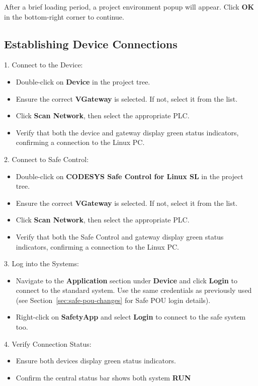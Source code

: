 \documentclass[a4paper,12pt]{article}
\begin{document}
After a brief loading period, a project environment popup will appear. Click \textbf{OK} in the bottom-right corner to continue.

\subsection{Establishing Device Connections}

1. Connect to the Device:
\begin{itemize}
	\item Double-click on \textbf{Device} in the project tree.
	\item Ensure the correct \textbf{VGateway} is selected. If not, select it from the list.
	\item Click \textbf{Scan Network}, then select the appropriate PLC.
	\item Verify that both the device and gateway display green status indicators, confirming a connection to the Linux PC.
\end{itemize}

2. Connect to Safe Control:
\begin{itemize}
	\item Double-click on \textbf{CODESYS Safe Control for Linux SL} in the project tree.
	\item Ensure the correct \textbf{VGateway} is selected. If not, select it from the list.
	\item Click \textbf{Scan Network}, then select the appropriate PLC.
	\item Verify that both the Safe Control and gateway display green status indicators, confirming a connection to the Linux PC.
\end{itemize}

3. Log into the Systems:
\begin{itemize}
	\item Navigate to the \textbf{Application} section under \textbf{Device} and click \textbf{Login} to connect to the standard system. Use the same credentials as previously used (see Section~\ref{sec:safe-pou-changes} for Safe POU login details).
	\item Right-click on \textbf{SafetyApp} and select \textbf{Login} to connect to the safe system too.
\end{itemize}

4. Verify Connection Status:
\begin{itemize}
	\item Ensure both devices display green status indicators.
	\item Confirm the central status bar shows both system \textbf{RUN}
\end{itemize}
\end{document}
